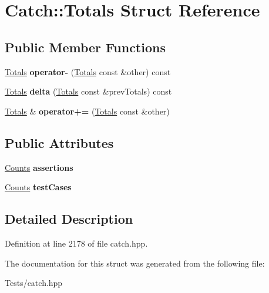 \hypertarget{struct_catch_1_1_totals}{}\section{Catch\+:\+:Totals Struct Reference}
\label{struct_catch_1_1_totals}
\subsection*{Public Member Functions}
\begin{DoxyCompactItemize}
\item 
\mbox{\label{struct_catch_1_1_totals_a9279ed39139cb7e7b291918a6d08290e}} 
\hyperlink{struct_catch_1_1_totals}{Totals} {\bfseries operator-\/} (\hyperlink{struct_catch_1_1_totals}{Totals} const \&other) const
\item 
\mbox{\label{struct_catch_1_1_totals_a1a94a654f5f3786b75695e081fc9bca2}} 
\hyperlink{struct_catch_1_1_totals}{Totals} {\bfseries delta} (\hyperlink{struct_catch_1_1_totals}{Totals} const \&prev\+Totals) const
\item 
\mbox{\label{struct_catch_1_1_totals_a574015076e54cc405c70b053e3356e43}} 
\hyperlink{struct_catch_1_1_totals}{Totals} \& {\bfseries operator+=} (\hyperlink{struct_catch_1_1_totals}{Totals} const \&other)
\end{DoxyCompactItemize}
\subsection*{Public Attributes}
\begin{DoxyCompactItemize}
\item 
\mbox{\label{struct_catch_1_1_totals_a885ded66df752147b30c3d45aa602ec9}} 
\hyperlink{struct_catch_1_1_counts}{Counts} {\bfseries assertions}
\item 
\mbox{\label{struct_catch_1_1_totals_adb195fe477aedee2ecea88c888f16506}} 
\hyperlink{struct_catch_1_1_counts}{Counts} {\bfseries test\+Cases}
\end{DoxyCompactItemize}


\subsection{Detailed Description}


Definition at line 2178 of file catch.\+hpp.



The documentation for this struct was generated from the following file\+:\begin{DoxyCompactItemize}
\item 
Tests/catch.\+hpp\end{DoxyCompactItemize}
